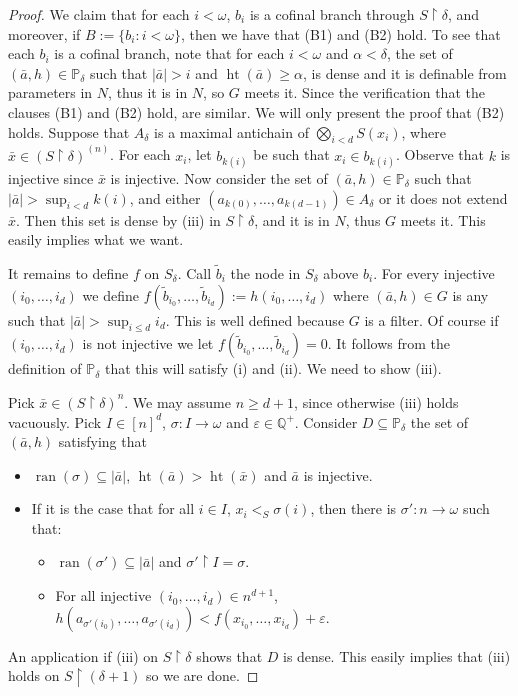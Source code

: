\documentclass[10pt,a4paper]{amsart}
\DeclareMathOperator{\hht}{ht}
\DeclareMathOperator{\ran}{ran}
\newcommand{\Q}{\mathbb{Q}}
\newcommand{\res}{\restriction}
\newcommand{\seb}{\subseteq}
\renewcommand{\P}{\mathbb{P}}
\begin{document}
\begin{proof}
  We claim that for each $i < \omega$, $b_{i}$ is a cofinal branch
  through $S \res \delta$, and moreover, if
  $B := \{b_{i} : i< \omega\}$, then  we have that (B1) and (B2) hold.
  To see that each $b_{i}$ is a cofinal branch,
  note that for each $i < \omega$
  and $\alpha < \delta$, the set of $(\bar{a},h) \in \P_{\delta}$ such that
  $|\bar{a}| > i$ and $\hht(\bar{a}) \ge \alpha$, is dense and it
  is definable from parameters in $N$, thus it is in $N$, so
  $G$ meets it. Since the  verification that the  clauses  (B1) and (B2) hold, are similar.
  We will only present the proof that (B2) holds. Suppose that $A_{\delta}$ is a maximal
  antichain of $\bigotimes_{i < d}S(x_{i})$, where
  $\bar{x} \in (S\res \delta)^{(n)}$. For each $x_{i}$, let
  $b_{k(i)}$ be such that $x_{i} \in b_{k(i)}$. Observe that
  $k$ is injective since $\bar{x}$ is injective. Now consider the
  set of $(\bar{a},h) \in \P_{\delta}$ such that
  $|\bar{a}| > \sup_{i < d}k(i)$,
  and either $(a_{k(0)},\dots,a_{k(d-1)}) \in A_{\delta}$ or
  it does not extend $\bar{x}$. Then this set is dense by (iii) in
  $S \res \delta$,
  and it is in $N$, thus $G$ meets it. This easily implies what we want.

  It remains to define $f$ on $S_{\delta}$. Call
  $\tilde{b}_{i}$ the node in $S_{\delta}$ above $b_{i}$.
  For every injective $(i_{0},\dots,i_{d})$ we define
  $f(\tilde{b}_{i_{0}},\dots,\tilde{b}_{i_{d}}) := h(i_{0},\dots,i_{d})$
  where $(\bar{a},h) \in G$ is any such that $|\bar{a}| > \sup_{i \le d}i_{d}$.
  This is well defined because $G$ is a filter. Of course if $(i_{0},\dots,i_{d})$
  is not injective we let $f(\tilde{b}_{i_{0}},\dots,\tilde{b}_{i_{d}}) = 0$.
  It follows
  from the definition of $\P_{\delta}$ that this will satisfy
  (i) and (ii). We need to show (iii).

  Pick $\bar{x} \in (S\res \delta)^{n}$. We may assume $n \ge d+1$,
  since otherwise (iii) holds vacuously. Pick $I \in [n]^{d}$,
  $\sigma : I \to \omega$ and $\varepsilon \in \Q^{+}$.
  Consider $D \seb \P_{\delta}$ the set of $(\bar{a},h)$ satisfying that
  \begin{itemize}
    \item $\ran(\sigma) \seb |\bar{a}|$, $\hht(\bar{a}) > \hht(\bar{x})$ and
    $\bar{a}$ is injective.
    \item If it is the case that for all $i \in I$, $x_{i} <_{S} \sigma(i)$,
    then there is $\sigma' : n \to \omega$ such that:
    \begin{itemize}
      \item $\ran(\sigma') \seb |\bar{a}|$ and $\sigma' \res I = \sigma$.
      \item For all injective $(i_{0},\dots,i_{d}) \in n^{d+1}$,
  $h(a_{\sigma'(i_{0})},\dots,a_{\sigma'(i_{d})}) < f(x_{i_{0}},\dots,x_{i_{d}}) + \varepsilon$.
    \end{itemize}
  \end{itemize}
  An application if (iii) on $S \res \delta$ shows that $D$ is dense.
  This easily implies that (iii) holds on $S \res (\delta +1)$ so
  we are done.
\end{proof}
\end{document}
